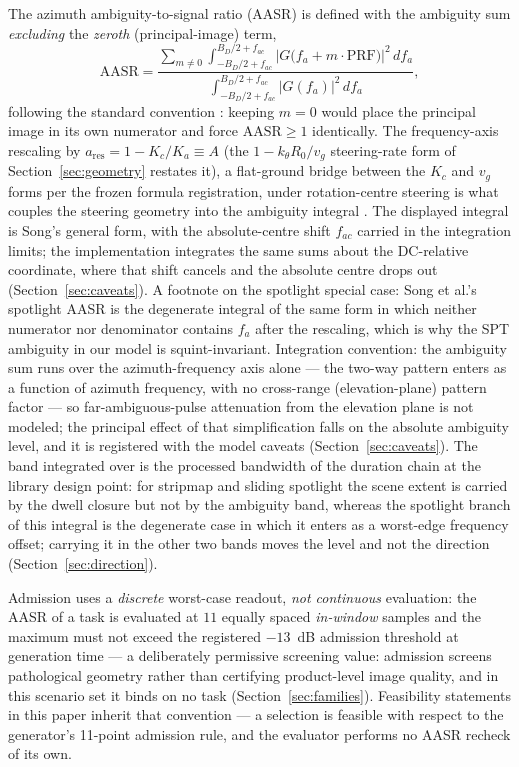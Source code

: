 \documentclass[preprint,authoryear]{elsarticle}
\begin{document}
The azimuth ambiguity-to-signal ratio (AASR) is defined with the ambiguity sum \emph{excluding} the \emph{zeroth} (principal-image) term,
\[
\mathrm{AASR}=\frac{\sum_{m\neq 0}\int_{-B_D/2+f_{ac}}^{B_D/2+f_{ac}}\big|G\big(f_a+m\cdot\mathrm{PRF}\big)\big|^{2}\,df_a}{\int_{-B_D/2+f_{ac}}^{B_D/2+f_{ac}}\big|G(f_a)\big|^{2}\,df_a},
\]
following the standard convention \citep{cumming2005digital}: keeping $m=0$ would place the principal image in its own numerator and force $\mathrm{AASR}\ge 1$ identically. The frequency-axis rescaling by $a_{\mathrm{res}}=1-K_c/K_a\equiv A$ (the $1-k_\theta R_0/v_g$ steering-rate form of Section~\ref{sec:geometry} restates it), a flat-ground bridge between the $K_c$ and $v_g$ forms per the frozen formula registration, under rotation-centre steering is what couples the steering geometry into the ambiguity integral \citep{song2025spaceborne}. The displayed integral is Song's general form, with the absolute-centre shift $f_{ac}$ carried in the integration limits; the implementation integrates the same sums about the DC-relative coordinate, where that shift cancels and the absolute centre drops out (Section~\ref{sec:caveats}). A footnote on the spotlight special case: Song et al.'s spotlight AASR \citep{song2025spaceborne} is the degenerate integral of the same form in which neither numerator nor denominator contains $f_a$ after the rescaling, which is why the SPT ambiguity in our model is squint-invariant. Integration convention: the ambiguity sum runs over the azimuth-frequency axis alone --- the two-way pattern enters as a function of azimuth frequency, with no cross-range (elevation-plane) pattern factor --- so far-ambiguous-pulse attenuation from the elevation plane is not modeled; the principal effect of that simplification falls on the absolute ambiguity level, and it is registered with the model caveats (Section~\ref{sec:caveats}). The band integrated over is the processed bandwidth of the duration chain at the library design point: for stripmap and sliding spotlight the scene extent is carried by the dwell closure but not by the ambiguity band, whereas the spotlight branch of this integral is the degenerate case in which it enters as a worst-edge frequency offset; carrying it in the other two bands moves the level and not the direction (Section~\ref{sec:direction}).

Admission uses a \emph{discrete} worst-case readout, \emph{not continuous} evaluation: the AASR of a task is evaluated at $11$ equally spaced \emph{in-window} samples and the maximum must not exceed the registered $-13$~dB admission threshold at generation time --- a deliberately permissive screening value: admission screens pathological geometry rather than certifying product-level image quality, and in this scenario set it binds on no task (Section~\ref{sec:families}). Feasibility statements in this paper inherit that convention --- a selection is feasible with respect to the generator's 11-point admission rule, and the evaluator performs no AASR recheck of its own.
\end{document}
